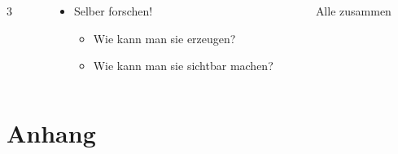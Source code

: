 \documentclass{beamer}
\begin{document}
\begin{frame}
  \begin{columns}
    \begin{column}{0.05\textwidth}
      \centering
      \alert{\Huge 3}
    \end{column}
    \begin{column}{0.68\textwidth}
      \begin{itemize}
      \item Selber forschen!
        \begin{itemize}
        \item Wie kann man sie erzeugen?
        \item Wie kann man sie sichtbar machen?
        \end{itemize}
      \end{itemize}
    \end{column}
    \begin{column}{0.27\textwidth}
      \centering
      \alert{Alle zusammen}
    \end{column}
  \end{columns}
\end{frame}




\section{Anhang}

\end{document}
